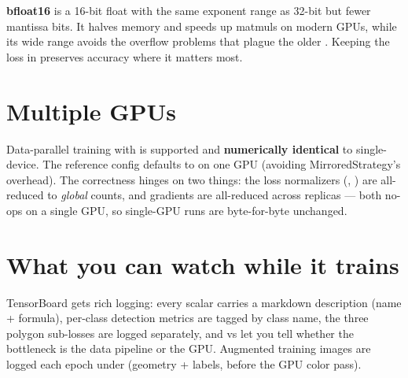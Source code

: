 \begin{teacher}
\textbf{bfloat16} is a 16-bit float with the same exponent range as 32-bit but fewer
mantissa bits. It halves memory and speeds up matmuls on modern GPUs, while its wide range
avoids the overflow problems that plague the older . Keeping the loss in
 preserves accuracy where it matters most.
\end{teacher}

\section{Multiple GPUs}
Data-parallel training with  is supported and \textbf{numerically
identical} to single-device. The reference config defaults to  on one
GPU (avoiding MirroredStrategy's overhead). The correctness hinges on two things: the loss
normalizers (, ) are all-reduced to \emph{global}
counts, and gradients are all-reduced across replicas --- both no-ops on a single GPU, so
single-GPU runs are byte-for-byte unchanged.

\section{What you can watch while it trains}
TensorBoard gets rich logging: every scalar carries a markdown description (name +
formula), per-class detection metrics are tagged by class name, the three polygon
sub-losses are logged separately, and  vs
 let you tell whether the bottleneck is the data
pipeline or the GPU. Augmented training images are logged each epoch under
 (geometry + labels, before the GPU color pass).
